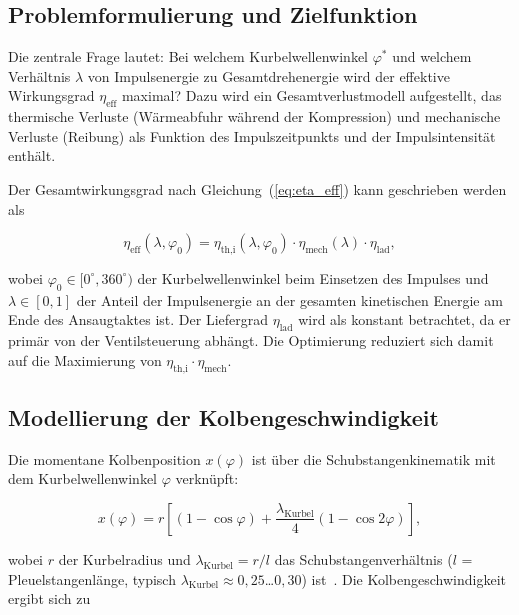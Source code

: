 ﻿\documentclass[a4paper,12pt]{article}
\begin{document}
\subsection{Problemformulierung und Zielfunktion}

Die zentrale Frage lautet: Bei welchem Kurbelwellenwinkel $\varphi^*$ und welchem
Verhältnis $\lambda$ von Impulsenergie zu Gesamtdrehenergie wird der effektive
Wirkungsgrad $\eta_\text{eff}$ maximal? Dazu wird ein Gesamtverlustmodell aufgestellt,
das thermische Verluste (Wärmeabfuhr während der Kompression) und mechanische Verluste
(Reibung) als Funktion des Impulszeitpunkts und der Impulsintensität enthält.

Der Gesamtwirkungsgrad nach Gleichung~(\ref{eq:eta_eff}) kann geschrieben werden als

\begin{equation}
  \eta_\text{eff}(\lambda, \varphi_0) =
    \eta_\text{th,i}(\lambda, \varphi_0) \cdot
    \eta_\text{mech}(\lambda) \cdot
    \eta_\text{lad},
  \label{eq:eta_gesamt}
\end{equation}

\noindent
wobei $\varphi_0 \in [0^\circ, 360^\circ)$ der Kurbelwellenwinkel beim Einsetzen des Impulses
und $\lambda \in [0, 1]$ der Anteil der Impulsenergie an der gesamten kinetischen
Energie am Ende des Ansaugtaktes ist. Der Liefergrad $\eta_\text{lad}$ wird als
konstant betrachtet, da er primär von der Ventilsteuerung abhängt. Die Optimierung
reduziert sich damit auf die Maximierung von
$\eta_\text{th,i} \cdot \eta_\text{mech}$.

\subsection{Modellierung der Kolbengeschwindigkeit}

Die momentane Kolbenposition $x(\varphi)$ ist über die Schubstangenkinematik mit
dem Kurbelwellenwinkel $\varphi$ verknüpft:

\begin{equation}
  x(\varphi) = r\left[\left(1 - \cos\varphi\right) +
    \frac{\lambda_\text{Kurbel}}{4}\left(1 - \cos 2\varphi\right)\right],
  \label{eq:kolbenpos}
\end{equation}

\noindent
wobei $r$ der Kurbelradius und $\lambda_\text{Kurbel} = r/l$ das Schubstangenverhältnis
($l$ = Pleuelstangenlänge, typisch $\lambda_\text{Kurbel} \approx 0{,}25$\ldots$0{,}30$)
ist~\cite{pischinger2009}. Die Kolbengeschwindigkeit ergibt sich zu
\end{document}
